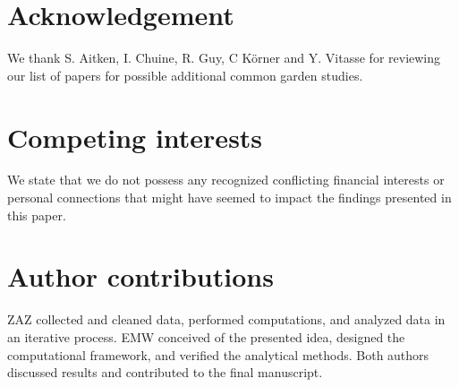 \documentclass[12pt]{article}
\begin{document}




\section{Acknowledgement}
We thank S. Aitken,  I. Chuine, R. Guy, C K\"{o}rner and Y. Vitasse for reviewing our list of papers for possible additional common garden studies. 

\section{Competing interests}
We state that we do not possess any recognized conflicting financial interests or personal connections that might have seemed to impact the findings presented in this paper.

\section{Author contributions}
ZAZ collected and cleaned data, performed computations, and analyzed data in an iterative process. EMW conceived of the presented idea, designed the computational framework, and verified the analytical methods. Both authors discussed results and contributed to the final manuscript. 
\end{document}
